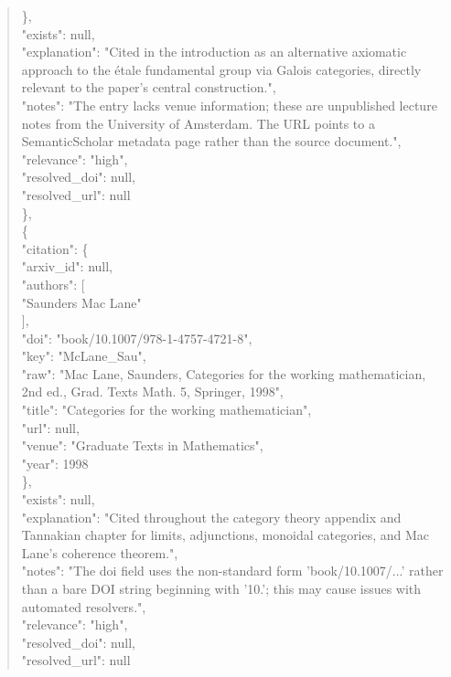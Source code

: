 \documentclass[11pt]{article}
\begin{document}
\begin{quote}
      \},\\
      "exists": null,\\
      "explanation": "Cited in the introduction as an alternative axiomatic approach to the étale fundamental group via Galois categories, directly relevant to the paper's central construction.",\\
      "notes": "The entry lacks venue information; these are unpublished lecture notes from the University of Amsterdam. The URL points to a SemanticScholar metadata page rather than the source document.",\\
      "relevance": "high",\\
      "resolved\_doi": null,\\
      "resolved\_url": null\\
    \},\\
    \{\\
      "citation": \{\\
        "arxiv\_id": null,\\
        "authors": [\\
          "Saunders Mac Lane"\\
        ],\\
        "doi": "book/10.1007/978-1-4757-4721-8",\\
        "key": "McLane\_Sau",\\
        "raw": "Mac Lane, Saunders, Categories for the working mathematician, 2nd ed., Grad. Texts Math. 5, Springer, 1998",\\
        "title": "Categories for the working mathematician",\\
        "url": null,\\
        "venue": "Graduate Texts in Mathematics",\\
        "year": 1998\\
      \},\\
      "exists": null,\\
      "explanation": "Cited throughout the category theory appendix and Tannakian chapter for limits, adjunctions, monoidal categories, and Mac Lane's coherence theorem.",\\
      "notes": "The doi field uses the non-standard form 'book/10.1007/...' rather than a bare DOI string beginning with '10.'; this may cause issues with automated resolvers.",\\
      "relevance": "high",\\
      "resolved\_doi": null,\\
      "resolved\_url": null\\

\end{quote}
\end{document}
